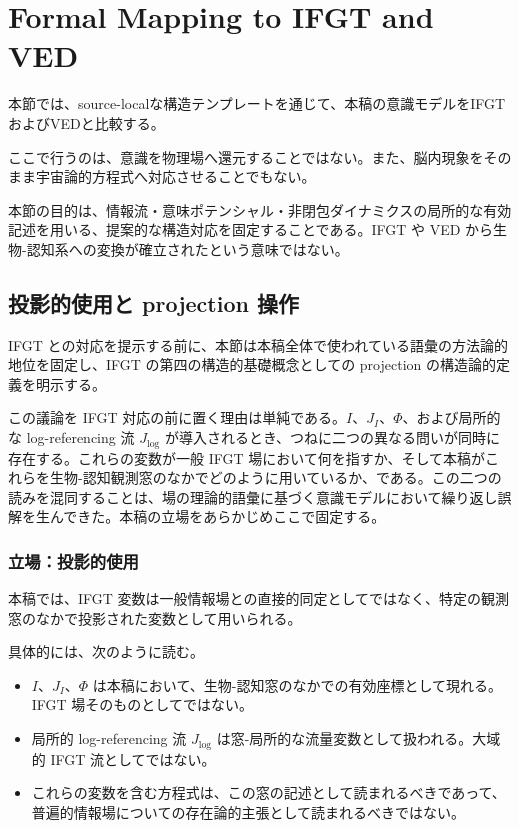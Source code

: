 \section{Formal Mapping to IFGT and VED}


本節では、source-localな構造テンプレートを通じて、本稿の意識モデルをIFGTおよびVEDと比較する。

ここで行うのは、意識を物理場へ還元することではない。また、脳内現象をそのまま宇宙論的方程式へ対応させることでもない。

本節の目的は、情報流・意味ポテンシャル・非閉包ダイナミクスの局所的な有効記述を用いる、提案的な構造対応を固定することである。IFGT や VED から生物-認知系への変換が確立されたという意味ではない。

\subsection{投影的使用と projection 操作}
\label{sec:projected-uses}

IFGT との対応を提示する前に、本節は本稿全体で使われている語彙の方法論的地位を固定し、IFGT の第四の構造的基礎概念としての projection の構造論的定義を明示する。

この議論を IFGT 対応の前に置く理由は単純である。$I$、$J_I$、$\Phi$、および局所的な log-referencing 流 $J_{\log}$ が導入されるとき、つねに二つの異なる問いが同時に存在する。これらの変数が一般 IFGT 場において何を指すか、そして本稿がこれらを生物-認知観測窓のなかでどのように用いているか、である。この二つの読みを混同することは、場の理論的語彙に基づく意識モデルにおいて繰り返し誤解を生んできた。本稿の立場をあらかじめここで固定する。

\subsubsection{立場：投影的使用}
\label{sec:projected-uses-stance}

本稿では、IFGT 変数は一般情報場との直接的同定としてではなく、特定の観測窓のなかで投影された変数として用いられる。

具体的には、次のように読む。

\begin{itemize}
\item $I$、$J_I$、$\Phi$ は本稿において、生物-認知窓のなかでの有効座標として現れる。IFGT 場そのものとしてではない。
\item 局所的 log-referencing 流 $J_{\log}$ は窓-局所的な流量変数として扱われる。大域的 IFGT 流としてではない。
\item これらの変数を含む方程式は、この窓の記述として読まれるべきであって、普遍的情報場についての存在論的主張として読まれるべきではない。
\end{itemize}

